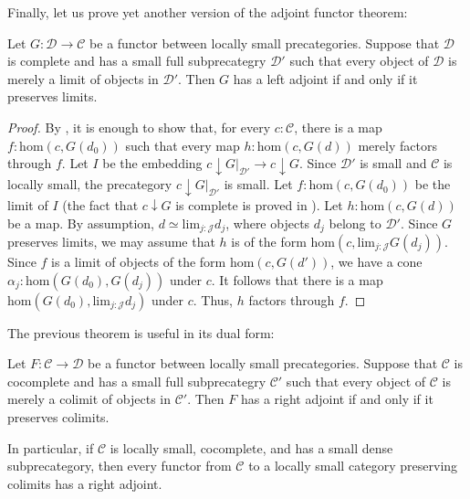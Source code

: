 \documentclass[reqno]{amsart}
\theoremstyle{definition}
\theoremstyle{remark}
\newcommand{\fs}[1]{\mathrm{#1}}
\newcommand{\scat}[1]{\mathcal{#1}}
\renewcommand{\hom}{\fs{hom}}
\numberwithin{figure}{section}
\begin{document}
Finally, let us prove yet another version of the adjoint functor theorem:

\begin{thm}[yaraft]
Let $G : \scat{D} \to \scat{C}$ be a functor between locally small precategories.
Suppose that $\scat{D}$ is complete and has a small full subprecategry $\scat{D}'$ such that every object of $\scat{D}$ is merely a limit of objects in $\scat{D}'$.
Then $G$ has a left adjoint if and only if it preserves limits.
\end{thm}
\begin{proof}
By , it is enough to show that, for every $c : \scat{C}$, there is a map $f : \hom(c,G(d_0))$ such that every map $h : \hom(c,G(d))$ merely factors through $f$.
Let $I$ be the embedding $c \downarrow G|_{\scat{D}'} \to c \downarrow G$.
Since $\scat{D}'$ is small and $\scat{C}$ is locally small, the precategory $c \downarrow G|_{\scat{D}'}$ is small.
Let $f : \hom(c,G(d_0))$ be the limit of $I$ (the fact that $c \downarrow G$ is complete is proved in \cite[Theorem~V.6.2]{maclane}).
Let $h : \hom(c,G(d))$ be a map.
By assumption, $d \simeq \fs{lim}_{j : \scat{J}} d_j$, where objects $d_j$ belong to $\scat{D}'$.
Since $G$ preserves limits, we may assume that $h$ is of the form $\hom(c,\fs{lim}_{j : \scat{J}} G(d_j))$.
Since $f$ is a limit of objects of the form $\hom(c,G(d'))$, we have a cone $\alpha_j : \hom(G(d_0),G(d_j))$ under $c$.
It follows that there is a map $\hom(G(d_0), \fs{lim}_{j : \scat{J}} d_j)$ under $c$.
Thus, $h$ factors through $f$.
\end{proof}

The previous theorem is useful in its dual form:

\begin{cor}[yalaft]
Let $F : \scat{C} \to \scat{D}$ be a functor between locally small precategories.
Suppose that $\scat{C}$ is cocomplete and has a small full subprecategry $\scat{C}'$ such that every object of $\scat{C}$ is merely a colimit of objects in $\scat{C}'$.
Then $F$ has a right adjoint if and only if it preserves colimits.
\end{cor}

In particular, if $\scat{C}$ is locally small, cocomplete, and has a small dense subprecategory, then every functor from $\scat{C}$ to a locally small category preserving colimits has a right adjoint.



\end{document}
